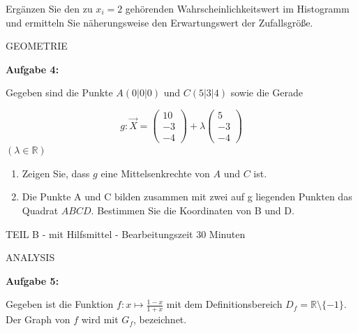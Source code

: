 \documentclass[a4paper,12pt]{article}
\newcommand{\Aufgabe}[1]{
  {
  \vspace*{0.5cm}
  \textsf{\textbf{Aufgabe #1}}
  \vspace*{0.2cm}
  
  }
}
\begin{document}

Ergänzen Sie den zu $x_i=2$ gehörenden Wahrscheinlichkeitswert im Histogramm und ermitteln Sie näherungsweise den Erwartungswert der Zufallsgröße.

\vspace{0.5cm}
GEOMETRIE

\Aufgabe{4:} 

Gegeben sind die Punkte $A (0|0|0)$ und $ C (5|3|4)$ sowie die Gerade

\[
       g: \vec{X} = \begin{pmatrix}10 \\ -3 \\-4 \end{pmatrix} 
                  + \lambda \begin{pmatrix}5 \\ -3 \\-4 \end{pmatrix}          
\] 
$(\lambda \in \mathbb{R})$

\begin{enumerate}[label={\alph*)}]
\item Zeigen Sie, dass $ g$  eine Mittelsenkrechte von $A$ und $C$ ist.
\item  Die Punkte A und C bilden zusammen mit zwei auf g liegenden Punkten das Quadrat
 $ABCD$. Bestimmen Sie die Koordinaten von B und D.
\end{enumerate}

\vspace {0,5cm}


\newpage

\vspace{0,5cm} {TEIL B} - mit Hilfsmittel - Bearbeitungszeit 30 Minuten
\vspace {0,2cm}


\vspace {0,5cm}
ANALYSIS

\Aufgabe{5:}
Gegeben ist die Funktion $f: x\mapsto \frac{1-x}{1+x}$ mit dem Definitionsbereich $D_f = \mathbb{R}\setminus\{-1\}$. Der Graph von $f$ wird mit $G_f$, bezeichnet.
\end{document}
